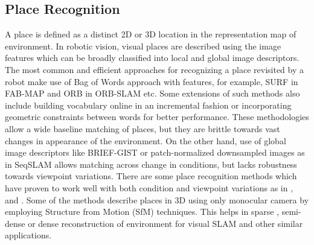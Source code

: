 \subsection{Place Recognition}
A place is defined as a distinct 2D or 3D location in the representation map of environment. In robotic vision, visual places are described using the image features which can be broadly classified into local and global image descriptors. The most common and efficient approaches for recognizing a place revisited by a robot make use of Bag of Words approach with features, for example, SURF in FAB-MAP \cite{Cummins2010} and ORB in ORB-SLAM \cite{Montiel2015} etc. Some extensions of such methods also include building vocabulary online in an incremental fashion or incorporating geometric constraints between words for better performance. These methodologies allow a wide baseline matching of places, but they are brittle towards vast changes in appearance of the environment. On the other hand, use of global image descriptors like BRIEF-GIST \cite{Sunderhauf2011} or patch-normalized downsampled images as in SeqSLAM \cite{Milford2012} allows matching across change in conditions, but lacks robustness towards viewpoint variations. There are some place recognition methods which have proven to work well with both condition and viewpoint variations as in \cite{McManus2014}, \cite{Milford2008} and \cite{Niko2015}. Some of the methods describe places in 3D using only monocular camera by employing Structure from Motion (SfM) techniques. This helps in sparse \cite{Montiel2015}, semi-dense \cite{Engel2014lsd, Mur-Artal2015b} or dense \cite{Newcombe2011} reconstruction of environment for visual SLAM and other similar applications.